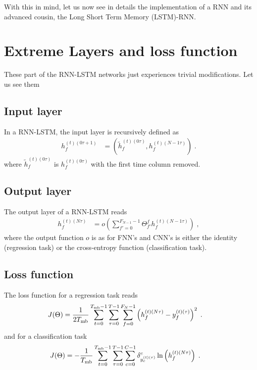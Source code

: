 With this in mind, let us now see in details the implementation of a RNN and its advanced cousin, the Long Short Term Memory (LSTM)-RNN.

\section{Extreme Layers and loss function}

These part of the RNN-LSTM networks just experiences trivial modifications. Let us see them

\subsection{Input layer}

In a RNN-LSTM, the input layer is recursively defined as 
\begin{align}
h^{(t)(0\tau+1)}_{f}&=\left(\tilde{h}^{(t)(0\tau)}_{f},h^{(t)(N-1\tau)}_{f}\right)\;.
\end{align}
where $\tilde{h}^{(t)(0\tau)}_{f}$ is $h^{(t)(0\tau)}_{f}$ with the first time column removed.

\subsection{Output layer }

The output layer of a RNN-LSTM reads
\begin{align}
h^{(t)(N\tau)}_{f}&=o\left(\sum_{f'=0}^{F_{N-1}-1}\Theta^f_{f'} h^{(t)(N-1\tau)}_{f}\right)\;,
\end{align}
where the output function $o$ is as for FNN's and CNN's is either the identity (regression task) or the cross-entropy function (classification task).

\subsection{Loss function}

The loss function for a regression task reads
\begin{align}
J(\Theta)&=\frac{1}{2T_{{\rm mb}}}\sum_{t=0}^{T_{{\rm mb}}-1}\sum_{\tau=0}^{T-1}\sum_{f=0}^{F_N-1}
%
\left(h^{(t)( N\tau)}_f-y^{(t)(\tau)}_f\right)^2\;.
\end{align}
and for a classification task
\begin{align}
J(\Theta)&=-\frac{1}{T_{{\rm mb}}}\sum_{t=0}^{T_{{\rm mb}}-1}\sum_{\tau=0}^{T-1}\sum_{c=0}^{C-1}
%
\delta^{c}_{y^{(t)(\tau)}_c}  \ln \left(h^{(t)( N\tau)}_f\right)\;.
\end{align}


